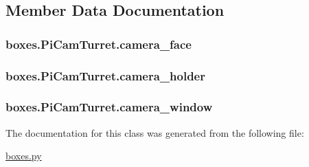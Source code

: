 \subsection{Member Data Documentation}
\hypertarget{classboxes_1_1_pi_cam_turret_a3c55835e83924ed5de65cc953facca8d}{}
\subsubsection[{camera\+\_\+face}]{\setlength{\rightskip}{0pt plus 5cm}boxes.\+Pi\+Cam\+Turret.\+camera\+\_\+face}\label{classboxes_1_1_pi_cam_turret_a3c55835e83924ed5de65cc953facca8d}
\hypertarget{classboxes_1_1_pi_cam_turret_a168d0c74aaa88822277e76c56dbaf3b4}{}
\subsubsection[{camera\+\_\+holder}]{\setlength{\rightskip}{0pt plus 5cm}boxes.\+Pi\+Cam\+Turret.\+camera\+\_\+holder}\label{classboxes_1_1_pi_cam_turret_a168d0c74aaa88822277e76c56dbaf3b4}
\hypertarget{classboxes_1_1_pi_cam_turret_af88b8225bcf4705f0b77931fce6e3bac}{}
\subsubsection[{camera\+\_\+window}]{\setlength{\rightskip}{0pt plus 5cm}boxes.\+Pi\+Cam\+Turret.\+camera\+\_\+window}\label{classboxes_1_1_pi_cam_turret_af88b8225bcf4705f0b77931fce6e3bac}


The documentation for this class was generated from the following file\+:\begin{DoxyCompactItemize}
\item 
\hyperlink{boxes_8py}{boxes.\+py}\end{DoxyCompactItemize}
